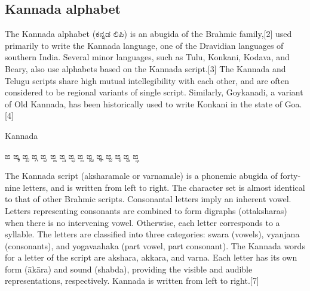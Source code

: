 \subsection{Kannada alphabet}

\newfontfamily{}

\def\kannadatext#1{{\kannada#1}}

The Kannada alphabet (\kannadatext{ಕನ್ನಡ ಲಿಪಿ}) is an abugida of the Brahmic family,[2] used primarily to write the Kannada language, one of the Dravidian languages of southern India. Several minor languages, such as Tulu, Konkani, Kodava, and Beary, also use alphabets based on the Kannada script.[3] The Kannada and Telugu scripts share high mutual intellegibility with each other, and are often considered to be regional variants of single script. Similarly, Goykanadi, a variant of Old Kannada, has been historically used to write Konkani in the state of Goa.[4]

\begin{scriptexample}[]{Kannada}
\centerline{\LARGE\kannadatext{ಙ	ಙ್ಕ	ಙ್ಖ	ಙ್ಗ	ಙ್ಘ	ಙ್ಙ	ಙ್ಚ	ಙ್ಛ	ಙ್ಜ	ಙ್ಝ	ಙ್ಞ	ಙ್ಟ	ಙ್ಠ	ಙ್ಡ	ಙ್ಢ}}
\end{scriptexample}

\medskip

The Kannada script (aksharamale or varnamale) is a phonemic abugida of forty-nine letters, and is written from left to right. The character set is almost identical to that of other Brahmic scripts. Consonantal letters imply an inherent vowel. Letters representing consonants are combined to form digraphs (ottaksharas) when there is no intervening vowel. Otherwise, each letter corresponds to a syllable.
The letters are classified into three categories: swara (vowels), vyanjana (consonants), and yogavaahaka (part vowel, part consonant).
The Kannada words for a letter of the script are akshara, akkara, and varna. Each letter has its own form (ākāra) and sound (shabda), providing the visible and audible representations, respectively. Kannada is written from left to right.[7]